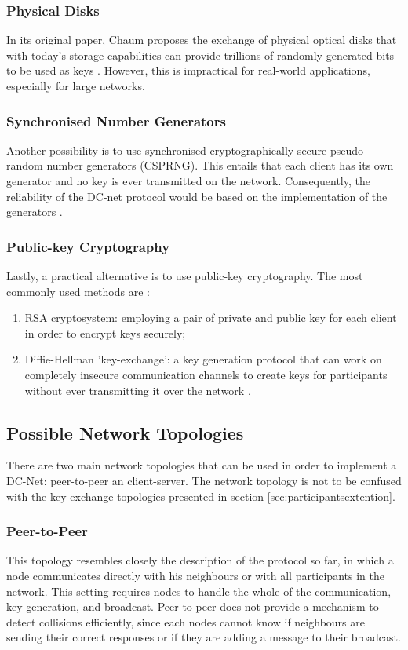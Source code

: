 \subsubsection{Physical Disks}
In its original paper, Chaum proposes the exchange of physical optical disks that with today's storage capabilities can provide trillions of randomly-generated bits to be used as keys \cite{Chaum}. However, this is impractical for real-world applications, especially for large networks. 

\subsubsection{Synchronised Number Generators}
Another possibility is to use synchronised cryptographically secure pseudo-random number generators (CSPRNG). This entails that each client has its own generator and no key is ever transmitted on the network. Consequently, the reliability of the DC-net protocol would be based on the implementation of the generators \cite{Chaum}.

\subsubsection{Public-key Cryptography}
Lastly, a practical alternative is to use public-key cryptography. The most commonly used methods are \cite{Chaum}:
\begin{enumerate}
    \item RSA cryptosystem: employing a pair of private and public key for each client in order to encrypt keys securely;
    \item Diffie-Hellman 'key-exchange': a key generation protocol that can work on completely insecure communication channels to create keys for participants without ever transmitting it over the network \cite{Golle}.
\end{enumerate}


\subsection{Possible Network Topologies}
There are two main network topologies that can be used in order to implement a DC-Net: peer-to-peer an client-server. The network topology is not to be confused with the key-exchange topologies presented in section \ref{sec:participantsextention}.

\subsubsection{Peer-to-Peer} \label{sec:peertopeer}
This topology resembles closely the description of the protocol so far, in which a node communicates directly with his neighbours or with all participants in the network. This setting requires nodes to handle the whole of the communication, key generation, and broadcast.
Peer-to-peer does not provide a mechanism to detect collisions efficiently, since each nodes cannot know if neighbours are sending their correct responses or if they are adding a message to their broadcast.


